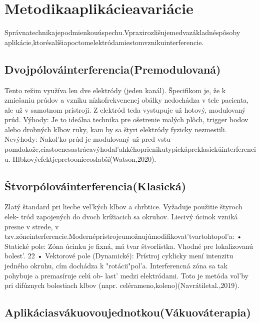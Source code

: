 \section{Metodikaaplikácieavariácie}

Správnatechnikajepodmienkouúspechu.Vpraxirozlišujemedvazákladnéspôsoby aplikácie,ktorésalíšiapoctomelektródamiestomvznikuinterferencie.


\subsection{Dvojpólováinterferencia(Premodulovaná)}

Tento režim využíva len dve elektródy (jeden kanál). Špecifikom je, že k zmiešaniu prúdov a vzniku nízkofrekvencnej obálky nedochádza v tele pacienta, ale už v samotnom prístroji. Z elektród teda vystupuje už hotový, modulovaný prúd. Výhody: Je to ideálna technika pre ošetrenie malých plôch, trigger bodov alebo drobných klbov ruky, kam by sa štyri elektródy fyzicky nezmestili. Nevýhody: Nakol’ko prúd je modulovaný už pred vstu- pomdokože,ciastocnesastrácavýhodal’ahkéhoprienikutypickápreklasickúinterferenciu. Hlbkovýefektjepretooniecoslabší(Watson,2020).


\subsection{Štvorpólováinterferencia(Klasická)}

Zlatý štandard pri liecbe vel’kých klbov a chrbtice. Vyžaduje použitie štyroch elek- tród zapojených do dvoch krížiacich sa okruhov. Liecivý úcinok vzniká presne v strede, v tzv.zóneinterferencie.Modernéprístrojeumožnujúmodifikovat’tvartohtopol’a: • Statické pole: Zóna úcinku je fixná, má tvar štvorlístka. Vhodné pre lokalizovanú bolest’. 22 • Vektorové pole (Dynamické): Prístroj cyklicky mení intenzitu jedného okruhu, cím dochádza k "rotácii"pol’a. Interferencná zóna sa tak pohybuje a premasíruje celú ob- last’ medzi elektródami. Toto je metóda vol’by pri difúznych bolestiach klbov (napr. celérameno,koleno)(Navrátiletal.,2019).


\subsection{Aplikáciasvákuovoujednotkou(Vákuováterapia)}

